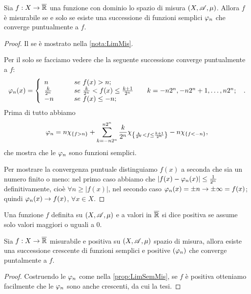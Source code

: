 \begin{proposition}\label{prop:LimSemMis}
	Sia $f:X \rightarrow \overline{\mathbb R}$ una funzione con dominio lo spazio di misura $(X,\mathscr A,\mu)$.
	Allora $f$ è misurabile se e solo se esiste una successione di funzioni semplici $\varphi_n$ che converge puntualmente a $f$.
\end{proposition}
\begin{proof}
	Il se è mostrato nella \cref{nota:LimMis}.
	
	Per il solo se facciamo vedere che la seguente successione converge puntualmente a $f$:
	\[
		\varphi_n(x) =
		\left\{ \begin{array}{ll}
			n &\qquad se\ f(x)>n;\\
			\frac{k}{2^n} &\qquad se\ \frac{k}{2^n}<f(x)\leq \frac{k+1}{2^n} \qquad k=-n2^n,-n2^n+1,\dots,n2^n;\\
			-n &\qquad se\ f(x)\leq-n;
		\end{array} \right.\ .
	\]
	Prima di tutto abbiamo 
	\[\varphi_n=
		n\chi_{\{f>n\}}+
		\sum_{k=-n2^n}^{n2^n}\frac{k}{2^n}\chi_{\left\{ \frac{k}{2^n}<f\leq \frac{k+1}{2^n} \right\}}
		-n\chi_{\{f<-n\}},
	\]
	che mostra che le $\varphi_n$ sono funzioni semplici.
	
	Per mostrare la convergenza puntuale distinguiamo $f(x)$ a seconda che sia un numero finito o meno:
	nel primo caso abbiamo che $|f(x)-\varphi_n(x)|\leq \frac{1}{2^n}$ definitivamente, cioè $\forall n\geq |f(x)|$,
	nel secondo caso $\varphi_n(x)=\pm n\rightarrow \pm\infty = f(x)$;
	quindi $\varphi_n(x)\rightarrow f(x)$, $\forall x\in X$.
\end{proof}

\begin{definition}
	Una funzione $f$ definita su $(X,\mathscr A,\mu)$ e a valori in $\overline{\mathbb R}$ si dice positiva se assume solo valori maggiori o uguali a 0.
\end{definition}


\begin{corollary}\label{cor:LimSemCrescMis}
	Sia $f:X\rightarrow \overline{\mathbb R}$ misurabile e positiva su $(X,\mathscr A,\mu)$ spazio di misura, allora esiste una successione crescente di funzioni semplici e positive $(\varphi_n)$ che converge puntalmente a $f$.
\end{corollary}
\begin{proof}
	Costruendo le $\varphi_n$ come nella \cref{prop:LimSemMis}, se $f$ è positiva otteniamo facilmente che le $\varphi_n$ sono anche crescenti, da cui la tesi.
\end{proof}


